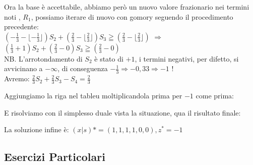\documentclass{article}
\begin{document}
Ora la base è accettabile, abbiamo però un nuovo valore frazionario nei termini noti , $R_1$, possiamo iterare di nuovo con gomory seguendo il procedimento precedente:\\

$  ( -\frac{1}{3} - \lfloor - \frac{1}{3} \rfloor )S_2 +  ( \frac{2}{3} - \lfloor \frac{2}{3} \rfloor )S_3 \geqq ( \frac{2}{3} - \lfloor \frac{2}{3} \rfloor )$  $\Rightarrow$  $( \frac{1}{3} + 1 )S_2 +  ( \frac{2}{3} - 0 )S_3 \geqq ( \frac{2}{3} - 0 )$\\
NB. L'arrotondamento di $S_2$ è stato di $+1$, i termini negativi, per difetto, si avvicinano a $- \infty$, di conseguenza $- \frac{1}{3} \Rightarrow -0,33 \Rightarrow -1 $ !\\
Avremo: $\frac{2}{3}S_2 + \frac{2}{3}S_3 -S_4 = \frac{2}{3}$

Aggiungiamo la riga nel tableu moltiplicandola prima per $-1$ come prima:\\

\begin{center}
\end{center}

E risolviamo con il simplesso duale vista la situazione, qua il risultato finale:\\

\begin{center}
\end{center}

La soluzione infine è: $(x|s)*=(1,1,1,1,0,0), z^* = -1$






\subsection{Esercizi Particolari}
\end{document}
